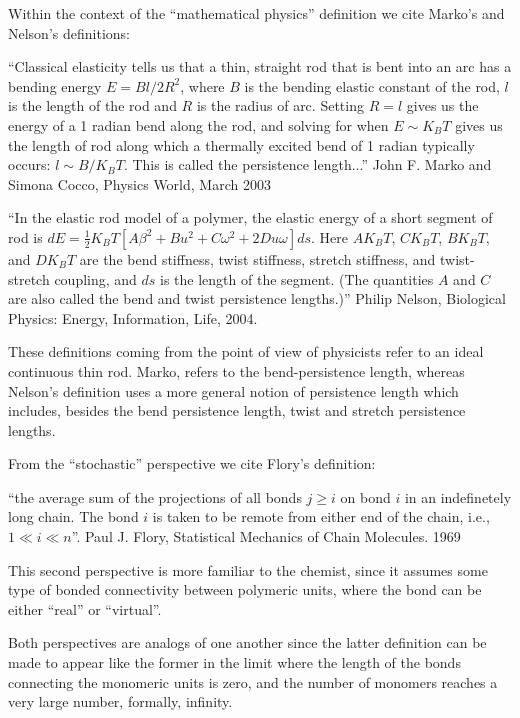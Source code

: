 Within the context of the ``mathematical physics'' definition we cite Marko's
and Nelson's definitions:

``Classical elasticity tells us that a thin, straight rod that is bent
into an arc has a bending energy $E=Bl/2R^2$, where $B$ is the bending
elastic constant of the  rod, $l$ is the length of the  rod and $R$ is
the radius  of arc. Setting  $R=l$ gives us  the energy of a  1 radian
bend along the rod, and solving  for when $E \sim K_{B}T$ gives us the
length  of  rod along  which  a thermally  excited  bend  of 1  radian
typically occurs:  $l \sim B/K_{B}T$.  This is  called the persistence
length...'' John F. Marko and Simona Cocco, Physics World, March 2003

``In the elastic rod model of a polymer, the elastic energy of a short
segment       of       rod       is       $dE=\frac{1}{2}       K_{B}T
[A\beta^2+Bu^2+C\omega^2+2Du\omega]  ds$.  Here  $AK_{B}T$, $CK_{B}T$,
$BK_{B}T$,  and $DK_{B}T$  are  the bend  stiffness, twist  stiffness,
stretch stiffness, and twist-stretch coupling, and $ds$ is the length of
the segment.   (The quantities $A$  and $C$ are  also called the  bend and
twist  persistence  lengths.)''   Philip Nelson,  Biological  Physics:
Energy, Information, Life, 2004.

These definitions coming from the point of view of physicists refer to
an ideal  continuous thin rod.  Marko, refers  to the bend-persistence
length,  whereas Nelson's  definition uses  a more  general  notion of
persistence length which includes, besides the bend persistence length,
twist and stretch persistence lengths.

From the ``stochastic'' perspective we cite Flory's definition:

``the average sum of  the projections of all bonds $ j  \geq i$ on bond
$i$ in an indefinetely long chain.  The bond $i$ is taken to be remote
from either end of  the chain, i.e., $1 \ll i \ll  n$''. Paul J. Flory,
Statistical Mechanics of Chain Molecules. 1969

This  second perspective  is more  familiar to  the chemist,  since it
assumes  some type  of  bonded connectivity  between polymeric  units,
where the bond can be either ``real'' or ``virtual''.

Both  perspectives  are  analogs  of  one  another  since  the  latter
definition can  be made to appear  like the former in  the limit where
the length  of the bonds connecting  the monomeric units  is zero, and
the  number  of  monomers  reaches  a  very  large  number,  formally,
infinity.

